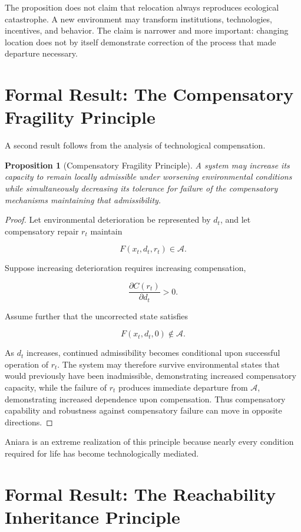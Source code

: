 \documentclass[11pt,oneside]{book}
\newtheorem{proposition}[theorem]{Proposition}
\theoremstyle{definition}
\theoremstyle{remark}
\newcommand{\A}{\mathcal{A}}
\begin{document}
The proposition does not claim that relocation always reproduces ecological catastrophe. A new environment may transform institutions, technologies, incentives, and behavior. The claim is narrower and more important: changing location does not by itself demonstrate correction of the process that made departure necessary.

\section{Formal Result: The Compensatory Fragility Principle}

A second result follows from the analysis of technological compensation.

\begin{proposition}[Compensatory Fragility Principle]
A system may increase its capacity to remain locally admissible under worsening environmental conditions while simultaneously decreasing its tolerance for failure of the compensatory mechanisms maintaining that admissibility.
\end{proposition}

\begin{proof}
Let environmental deterioration be represented by \(d_t\), and let compensatory repair \(r_t\) maintain

\[
F(x_t,d_t,r_t)\in\A.
\]

Suppose increasing deterioration requires increasing compensation,

\[
\frac{\partial C(r_t)}{\partial d_t}>0.
\]

Assume further that the uncorrected state satisfies

\[
F(x_t,d_t,0)\notin\A.
\]

As \(d_t\) increases, continued admissibility becomes conditional upon successful operation of \(r_t\). The system may therefore survive environmental states that would previously have been inadmissible, demonstrating increased compensatory capacity, while the failure of \(r_t\) produces immediate departure from \(\A\), demonstrating increased dependence upon compensation. Thus compensatory capability and robustness against compensatory failure can move in opposite directions.
\end{proof}

Aniara is an extreme realization of this principle because nearly every condition required for life has become technologically mediated.

\section{Formal Result: The Reachability Inheritance Principle}
\end{document}
